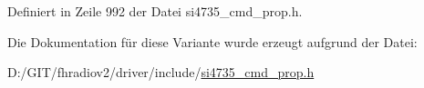Definiert in Zeile 992 der Datei si4735\+\_\+cmd\+\_\+prop.\+h.



Die Dokumentation für diese Variante wurde erzeugt aufgrund der Datei\+:\begin{DoxyCompactItemize}
\item 
D\+:/\+G\+I\+T/fhradiov2/driver/include/\hyperlink{si4735__cmd__prop_8h}{si4735\+\_\+cmd\+\_\+prop.\+h}\end{DoxyCompactItemize}
